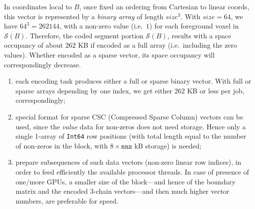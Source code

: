 In coordinates local to $B$, once fixed an ordering from Cartesian to linear coords, this vector is represented by a \emph{binary array} of length $size^3$. With $size=64$, we have $64^3=262144$,  with a non-zero value (i.e.~$1$) for each foreground voxel in $\mathcal{S}(B)$. Therefore, the coded segment portion $\mathcal{S}(B)$, results with a space occupancy of about $262$ KB if encoded as a full array (i.e.~including the zero values). Whether encoded as a sparse vector, its space occupancy will correspondingly decrease.

\begin{enumerate}

\item each encoding task produces either a full or sparse binary vector. With full or sparse arrays depending by one index, we get either 262 KB or less per job, correspondingly;

\item special format for sparse CSC (Compressed Sparse Column) vectors can be used, since the \emph{value} data for non-zeros does not need storage. Hence only a single 1-array of \texttt{Int64} row positions (with total length equal to the number of non-zeros in the block, with $8\times\mathtt{nnz}$ kB storage) is needed;

\item prepare subsequences of such data vectors (non-zero linear row indices), in order to feed efficiently the available processor threads.
In case of presence of one/more GPUs, a smaller size of the block---and hence of the boundary matrix and the encoded 3-chain vectors---and then much higher vector numbers, are preferable for speed.


\end{enumerate}

